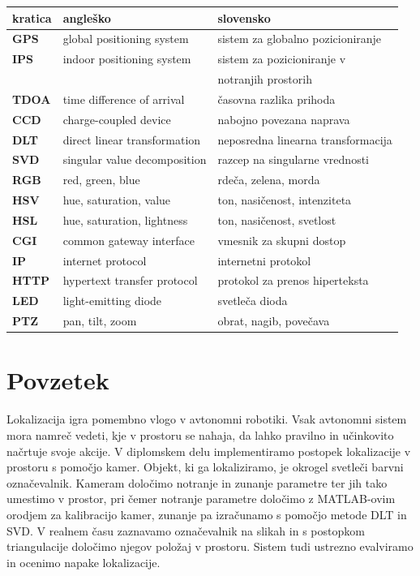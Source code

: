 \documentclass[a4paper, 12pt]{book}
\newcommand{\clearemptydoublepage}{\newpage{\pagestyle{empty}\cleardoublepage}}
\begin{document}
\begin{tabular}{l|l|l}
  {\bf kratica} & {\bf angleško} & {\bf slovensko} \\ \hline
  {\bf GPS} & global positioning system & sistem za globalno pozicioniranje \\
  {\bf IPS} & indoor positioning system & sistem za pozicioniranje v \\
  			& 							& notranjih prostorih \\
  {\bf TDOA} & time difference of arrival & časovna razlika prihoda \\
  {\bf CCD} & charge-coupled device & nabojno povezana naprava \\
  {\bf DLT} & direct linear transformation & neposredna linearna transformacija \\
  {\bf SVD} & singular value decomposition & razcep na singularne vrednosti \\
  {\bf RGB} & red, green, blue & rdeča, zelena, morda \\
  {\bf HSV} & hue, saturation, value & ton, nasičenost, intenziteta \\
  {\bf HSL} & hue, saturation, lightness & ton, nasičenost, svetlost \\
  {\bf CGI} & common gateway interface & vmesnik za skupni dostop \\
  {\bf IP} & internet protocol & internetni protokol \\
  {\bf HTTP} & hypertext transfer protocol & protokol za prenos hiperteksta \\
  {\bf LED} & light-emitting diode & svetleča dioda \\
  {\bf PTZ} & pan, tilt, zoom & obrat, nagib, povečava \\
\end{tabular}



\clearemptydoublepage

\chapter*{Povzetek}
Lokalizacija igra pomembno vlogo v avtonomni robotiki. Vsak avtonomni sistem mora namreč vedeti, kje v prostoru se nahaja, da lahko pravilno in učinkovito načrtuje svoje akcije. 
V diplomskem delu implementiramo postopek lokalizacije v prostoru s pomočjo kamer. Objekt, ki ga lokaliziramo, je okrogel svetleči barvni označevalnik. Kameram določimo notranje in zunanje parametre ter jih tako umestimo v prostor, pri čemer notranje parametre določimo z MATLAB-ovim orodjem za kalibracijo kamer, zunanje pa izračunamo s pomočjo metode DLT in SVD. V realnem času zaznavamo označevalnik na slikah in s postopkom triangulacije določimo njegov položaj v prostoru. Sistem tudi ustrezno evalviramo in ocenimo napake lokalizacije.
\bigskip
\end{document}
